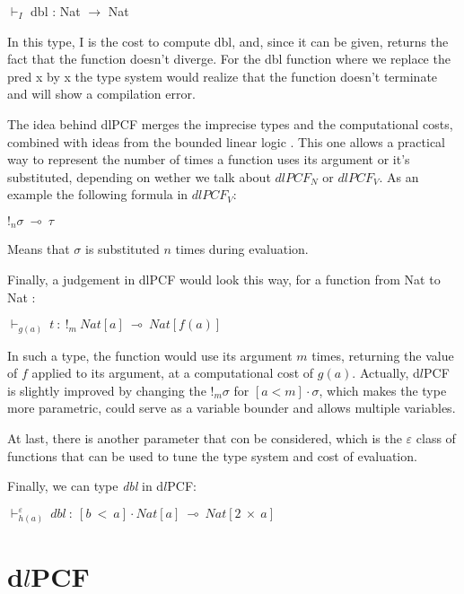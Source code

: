 \documentclass[a4paper,12pt]{article}
\begin{document}
\begin{center}
$\vdash_{I}$ dbl : Nat $\rightarrow$ Nat
\end{center}

In this type, I is the cost to compute dbl, and, since it can be given, returns
the fact that the function doesn't diverge. For the dbl function where
we replace the pred x by x the type system would realize that the function
doesn't terminate and will show a compilation error.

The idea behind dlPCF merges the imprecise types and the computational
costs, combined with ideas from the bounded linear logic
\cite{boundedlinearlogic}. This one allows a practical way to
represent the number of times a function uses its argument or it's
substituted, depending on wether we talk about $ dlPCF_{N} $ or $
dlPCF_{V} $. As an example the following formula in $ dlPCF_{V} $:

\begin{center}
$!_{n}\sigma~\multimap~\tau$
\end{center} 

Means that $\sigma$ is substituted $n$ times during evaluation. 

\medskip

Finally, a judgement in dlPCF would look this way, for a function from Nat to
Nat :

\begin{center}
$\vdash_{g(a)}~t~:~!_{m}~Nat[a]~\multimap~Nat[f(a)]$ 
\end{center}

In such a type, the function would use its argument $m$ times, returning 
the value of $f$ applied to its argument, at a computational cost of
$g(a)$. Actually, d$l$PCF is slightly improved by changing the $!_{m}\sigma$ for
$[a < m] \cdot \sigma$, which makes the type more parametric, could serve as a
variable bounder and allows multiple variables.

At last, there is another parameter that con be considered, which is the $\varepsilon$
class of functions that can be used to tune the type system and cost of
evaluation.

Finally, we can type \emph{dbl} in d$l$PCF:

\begin{center}
$\vdash^{\varepsilon}_{h(a)}~dbl~:~[b~<~a] \cdot Nat[a]~\multimap~Nat[2~\times~a]$
\end{center}

\section{d$l$PCF}
\end{document}
